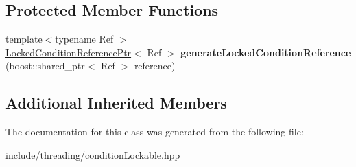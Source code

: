 \subsection*{Protected Member Functions}
\begin{DoxyCompactItemize}
\item 
\hypertarget{classcore_1_1threading_1_1_condition_lock_proxy_a59015b30a8f987ed5150cf5ca4e0cf7b}{{\footnotesize template$<$typename Ref $>$ }\\\hyperlink{classcore_1_1threading_1_1_locked_condition_reference_ptr}{Locked\-Condition\-Reference\-Ptr}$<$ Ref $>$ {\bfseries generate\-Locked\-Condition\-Reference} (boost\-::shared\-\_\-ptr$<$ Ref $>$ reference)}\label{classcore_1_1threading_1_1_condition_lock_proxy_a59015b30a8f987ed5150cf5ca4e0cf7b}

\end{DoxyCompactItemize}
\subsection*{Additional Inherited Members}


The documentation for this class was generated from the following file\-:\begin{DoxyCompactItemize}
\item 
include/threading/condition\-Lockable.\-hpp\end{DoxyCompactItemize}
